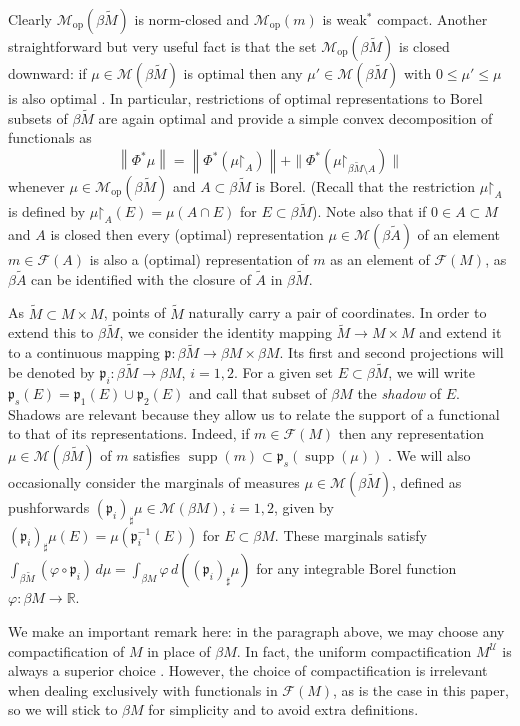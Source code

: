 \documentclass[a4paper,10pt]{amsart}
\DeclareMathOperator{\supp}{supp}                           %
\newcommand{\RR}{\mathbb{R}}                                %
\newcommand{\norm}[1]{\left\|{#1}\right\|}                  %
\newcommand{\restrict}{\mathord{\upharpoonright}}           %
\newcommand{\lipfree}[1]{\mathcal{F}({#1})}                 %
\newcommand{\meas}[1]{\mathcal{M}({#1})}                    %
\newcommand{\wt}[1]{\widetilde{#1}}                         %
\newcommand{\bwt}[1]{\beta\wt{#1}}                          %
\newcommand{\pp}{\mathfrak{p}}                              %
\newcommand{\opr}[1]{\mathcal{M}_{\mathrm{op}}(#1)}         %
\newcommand{\ucomp}[1]{#1^\mathcal{U}}                    %
\renewcommand{\leq}{\leqslant}
\theoremstyle{plain}
\theoremstyle{definition}
\theoremstyle{remark}
\begin{document}
Clearly $\opr{\bwt{M}}$ is norm-closed and $\opr{m}$ is weak$^*$ compact.
Another straightforward but very useful fact is that the set $\opr{\bwt{M}}$ is closed downward: if $\mu\in\meas{\bwt{M}}$ is optimal then any $\mu'\in\meas{\bwt{M}}$ with $0\leq\mu'\leq\mu$ is also optimal \cite[Proposition 2.1]{APS1}. In particular, restrictions of optimal representations to Borel subsets of $\bwt{M}$ are again optimal and provide a simple convex decomposition of functionals as
$$\norm{\Phi^*\mu}=\norm{\Phi^*(\mu\restrict_A)}+\|\Phi^*(\mu\restrict_{\bwt{M}\setminus A})\|$$
whenever $\mu\in\opr{\bwt{M}}$ and $A\subset \bwt{M}$ is Borel. (Recall that the restriction $\mu\restrict_A$ is defined by $\mu\restrict_A(E)=\mu(A\cap E)$ for $E\subset\bwt{M}$). Note also that if $0\in A\subset M$ and $A$ is closed then every (optimal) representation $\mu\in\meas{\bwt{A}}$ of an element $m\in\lipfree{A}$ is also a (optimal) representation of $m$ as an element of $\lipfree{M}$, as $\bwt{A}$ can be identified with the closure of $\wt{A}$ in $\bwt{M}$.

As $\wt{M}\subset M\times M$, points of $\wt{M}$ naturally carry a pair of coordinates. In order to extend this to $\bwt{M}$, we consider the identity mapping $\wt{M}\to M\times M$ and extend it to a continuous mapping $\pp:\bwt{M}\to\beta M\times\beta M$. Its first and second projections will be denoted by $\pp_i:\bwt{M}\to\beta M$, $i=1,2$. For a given set $E\subset\bwt{M}$, we will write $\pp_s(E)=\pp_1(E)\cup\pp_2(E)$ and call that subset of $\beta M$ the \emph{shadow} of $E$. Shadows are relevant because they allow us to relate the support of a functional to that of its representations. Indeed, if $m\in\lipfree{M}$ then any representation $\mu\in\meas{\bwt{M}}$ of $m$ satisfies $\supp(m)\subset\pp_s(\supp(\mu))$ \cite[Lemma 8]{Aliaga}. We will also occasionally consider the marginals of measures $\mu\in\meas{\bwt{M}}$, defined as pushforwards $(\pp_i)_\sharp\mu\in\meas{\beta M}$, $i=1,2$, given by $(\pp_i)_\sharp\mu(E)=\mu(\pp_i^{-1}(E))$ for $E\subset\beta M$. These marginals satisfy $\int_{\bwt{M}}(\varphi\circ\pp_i)\,d\mu=\int_{\beta M}\varphi\,d((\pp_i)_\sharp\mu)$ for any integrable Borel function $\varphi:\beta M\to\RR$. 

We make an important remark here: in the paragraph above, we may choose any compactification of $M$ in place of $\beta M$. In fact, the uniform compactification $\ucomp{M}$ is always a superior choice \cite{APS2}. However, the choice of compactification is irrelevant when dealing exclusively with functionals in $\lipfree{M}$, as is the case in this paper, so we will stick to $\beta M$ for simplicity and to avoid extra definitions.
\end{document}
